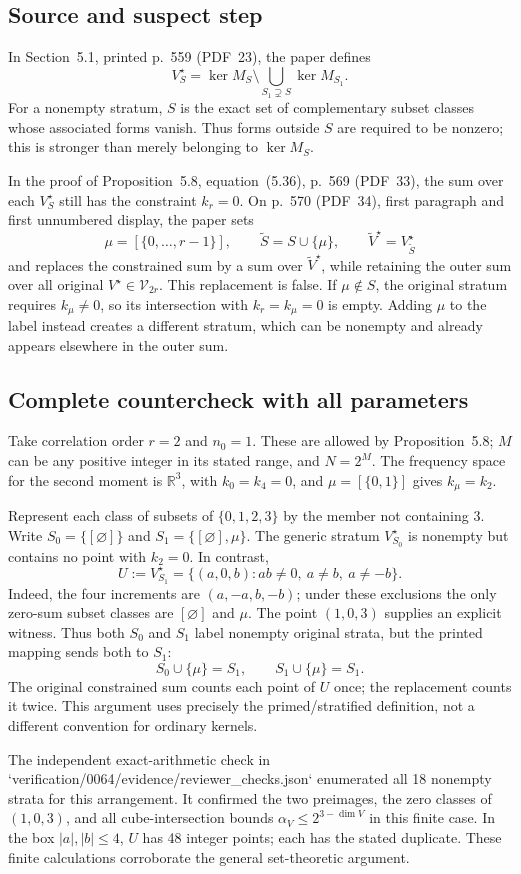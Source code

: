 \documentclass[10pt]{article}
\begin{document}
\subsection*{Source and suspect step}
In Section 5.1, printed p. 559 (PDF 23), the paper defines \[V_S^\star=\ker M_S\setminus
       \bigcup_{S_1\supsetneq S}\ker M_{S_1}.\] For a nonempty stratum, \(S\) is the exact set of complementary subset classes whose associated forms vanish. Thus forms outside \(S\) are required to be nonzero; this is stronger than merely belonging to \(\ker M_S\).\par
In the proof of Proposition 5.8, equation (5.36), p. 569 (PDF 33), the sum over each \(V_S^\star\) still has the constraint \(k_r=0\). On p. 570 (PDF 34), first paragraph and first unnumbered display, the paper sets \[\mu=[\{0,\ldots,r-1\}],\qquad
 \widetilde S=S\cup\{\mu\},\qquad
 \widetilde V^\star=V_{\widetilde S}^\star\] and replaces the constrained sum by a sum over \(\widetilde V^\star\), while retaining the outer sum over all original \(V^\star\in\mathcal V_{2r}\). This replacement is false. If \(\mu\notin S\), the original stratum requires \(k_\mu\ne0\), so its intersection with \(k_r=k_\mu=0\) is empty. Adding \(\mu\) to the label instead creates a different stratum, which can be nonempty and already appears elsewhere in the outer sum.\par
\subsection*{Complete countercheck with all parameters}
Take correlation order \(r=2\) and \(n_0=1\). These are allowed by Proposition 5.8; \(M\) can be any positive integer in its stated range, and \(N=2^M\). The frequency space for the second moment is \(\mathbb R^3\), with \(k_0=k_4=0\), and \(\mu=[\{0,1\}]\) gives \(k_\mu=k_2\).\par
Represent each class of subsets of \(\{0,1,2,3\}\) by the member not containing 3. Write \(S_0=\{[\varnothing]\}\) and \(S_1=\{[\varnothing],\mu\}\). The generic stratum \(V_{S_0}^\star\) is nonempty but contains no point with \(k_2=0\). In contrast, \[U:=V_{S_1}^\star
   =\{(a,0,b): a b\ne0,\ a\ne b,\ a\ne-b\}.\] Indeed, the four increments are \((a,-a,b,-b)\); under these exclusions the only zero-sum subset classes are \([\varnothing]\) and \(\mu\). The point \((1,0,3)\) supplies an explicit witness. Thus both \(S_0\) and \(S_1\) label nonempty original strata, but the printed mapping sends both to \(S_1\): \[S_0\cup\{\mu\}=S_1,\qquad S_1\cup\{\mu\}=S_1.\] The original constrained sum counts each point of \(U\) once; the replacement counts it twice. This argument uses precisely the primed/stratified definition, not a different convention for ordinary kernels.\par
The independent exact-arithmetic check in `verification/0064/evidence/reviewer\_checks.json` enumerated all 18 nonempty strata for this arrangement. It confirmed the two preimages, the zero classes of \((1,0,3)\), and all cube-intersection bounds \(\alpha_V\le 2^{3-\dim V}\) in this finite case. In the box \(|a|,|b|\le4\), \(U\) has 48 integer points; each has the stated duplicate. These finite calculations corroborate the general set-theoretic argument.\par
\end{document}
